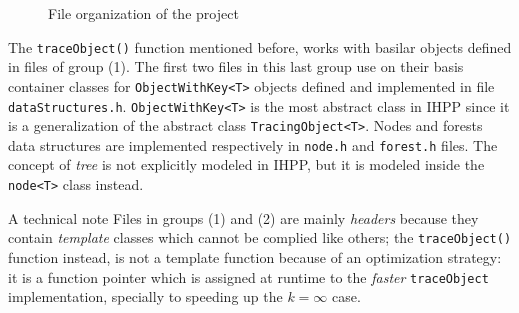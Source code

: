 \documentclass[a4paper,10pt]{report}
\begin{document}
\begin{figure}[H]


\caption{File organization of the project}
\label{proj_files}

\end{figure}

\noindent 
The \verb|traceObject()| function mentioned before, works with basilar objects 
defined in files of group (1). The first two files in this last group use on their basis
container classes for \verb|ObjectWithKey<T>| objects defined and implemented 
in file \verb|dataStructures.h|.
\verb|ObjectWithKey<T>| is the most abstract class in IHPP since it is a generalization of the abstract class \verb|TracingObject<T>|. 
Nodes and forests data structures are implemented respectively in \verb|node.h| and \verb|forest.h| files. The concept of \emph{tree} is not explicitly modeled in IHPP, but it is 
modeled inside the \verb|node<T>| class instead. 
\begin{paragraph}{A technical note}
Files in groups (1) and (2) 
are mainly \emph{headers} because they
contain \emph{template} classes which cannot be complied like others; 
the \verb|traceObject()| function instead, is not a template function because of 
an optimization strategy: it is a function pointer which is assigned at runtime
to the \emph{faster} \verb|traceObject| implementation, specially to speeding up 
the $k=\infty$ case. 
\end{paragraph}
\end{document}
